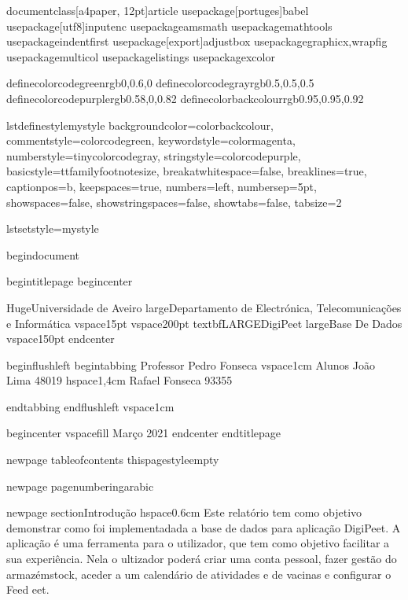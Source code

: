 documentclass[a4paper, 12pt]{article}
usepackage[portuges]{babel}
usepackage[utf8]{inputenc}
usepackage{amsmath}
usepackage{mathtools}
usepackage{indentfirst}
usepackage[export]{adjustbox}
usepackage{graphicx,wrapfig}
usepackage{multicol}
usepackage{listings}
usepackage{xcolor}

definecolor{codegreen}{rgb}{0,0.6,0}
definecolor{codegray}{rgb}{0.5,0.5,0.5}
definecolor{codepurple}{rgb}{0.58,0,0.82}
definecolor{backcolour}{rgb}{0.95,0.95,0.92}

lstdefinestyle{mystyle}{
    backgroundcolor=color{backcolour},   
    commentstyle=color{codegreen},
    keywordstyle=color{magenta},
    numberstyle=tinycolor{codegray},
    stringstyle=color{codepurple},
    basicstyle=ttfamilyfootnotesize,
    breakatwhitespace=false,         
    breaklines=true,                 
    captionpos=b,                    
    keepspaces=true,                 
    numbers=left,                    
    numbersep=5pt,                  
    showspaces=false,                
    showstringspaces=false,
    showtabs=false,                  
    tabsize=2
}

lstset{style=mystyle}







begin{document}

begin{titlepage}
	begin{center}
	
		Huge{Universidade de Aveiro}
		large{Departamento de Electrónica, Telecomunicações e Informática} 
		vspace{15pt}
        vspace{200pt}
        textbf{LARGE{DigiPeet}}
        large{Base De Dados}
		vspace{150pt}
	end{center}
	
	begin{flushleft}
		begin{tabbing}
			Professor Pedro Fonseca
			vspace{1cm}
			Alunos João Lima 48019 
			hspace{1,4cm}
			Rafael Fonseca 93355
			
	end{tabbing}
 end{flushleft}
	vspace{1cm}
	
	begin{center}
		vspace{fill}
			 Março
		 2021
			end{center}
end{titlepage}


newpage
tableofcontents
thispagestyle{empty}

newpage
pagenumbering{arabic}


newpage
section{Introdução}
hspace{0.6cm}
Este relatório tem como objetivo demonstrar como foi implementadada a base de dados para aplicação DigiPeet. A aplicação é uma ferramenta para o utilizador, que tem como objetivo facilitar a sua experiência. Nela o ultizador poderá criar uma conta pessoal, fazer gestão do armazémstock, aceder a um calendário de atividades e de vacinas e configurar o Feed eet.

